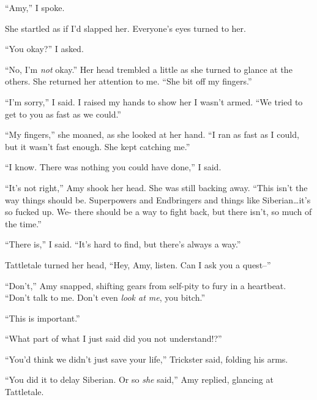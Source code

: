 ``Amy,'' I spoke.



She startled as if I'd slapped her.  Everyone's eyes turned to her.



``You okay?''  I asked.



``No, I'm \emph{not} okay.''  Her head trembled a little as she turned to glance at the others.  She returned her attention to me.  ``She bit off my fingers.''



``I'm sorry,'' I said.  I raised my hands to show her I wasn't armed.  ``We tried to get to you as fast as we could.''



``My fingers,'' she moaned, as she looked at her hand.  ``I ran as fast as I could, but it wasn't fast enough.  She kept catching me.''



``I know.  There was nothing you could have done,'' I said.



``It's not right,'' Amy shook her head.  She was still backing away. ``This isn't the way things should be.  Superpowers and Endbringers and things like Siberian\ldots it's so fucked up.  We- there should be a way to fight back, but there isn't, so much of the time.''



``There is,'' I said.  ``It's hard to find, but there's always a way.''



Tattletale turned her head, ``Hey, Amy, listen.  Can I ask you a quest--''



``Don't,'' Amy snapped, shifting gears from self-pity to fury in a heartbeat.  ``Don't talk to me.  Don't even \emph{look at me}, you bitch.''



``This is important.''



``What part of what I just said did you not understand!?''



``You'd think we didn't just save your life,'' Trickster said, folding his arms.



``You did it to delay Siberian.  Or so\emph{ she }said,'' Amy replied, glancing at Tattletale.



